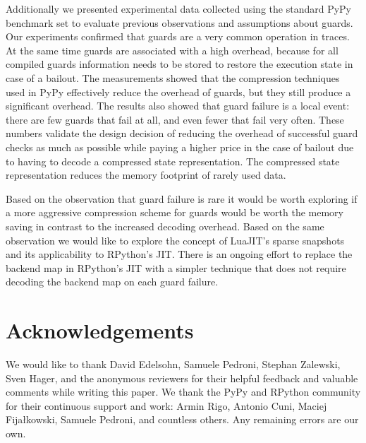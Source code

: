 \documentclass[letter,10pt]{sigplanconf}
\begin{document}
Additionally we presented experimental data collected using the standard PyPy
benchmark set to evaluate previous observations and assumptions about guards. Our
experiments confirmed that guards are a very common
operation in traces. At the same time guards are associated with a high
overhead, because for all compiled guards information needs to be
stored to restore the execution state in case of a bailout. The measurements
showed that the compression techniques used in PyPy effectively reduce the
overhead of guards, but they still produce a significant overhead. The results
also showed that guard failure is a local event: there are few
guards that fail at all, and even fewer that fail very often.
These numbers validate the design decision of reducing the overhead of
successful guard checks as much as possible while paying a higher price in the
case of bailout due to having to decode a compressed state representation.
The compressed state representation reduces the memory footprint of rarely
used data.

Based on the observation that guard failure is rare it
would be worth exploring if a more aggressive compression scheme for guards
would be worth the memory saving in contrast to the increased decoding
overhead. Based on the same observation we would like to explore the concept of
LuaJIT's sparse snapshots and its applicability to RPython's JIT.
There is an ongoing effort to replace the backend map in RPython's JIT with a
simpler technique that does not require decoding the backend map on each guard
failure.

\section*{Acknowledgements}
We would like to thank David Edelsohn, Samuele Pedroni, Stephan Zalewski, Sven
Hager, and the anonymous reviewers for their helpful
feedback and valuable comments while writing this paper.
We thank the PyPy and RPython community for their continuous support and work:
Armin Rigo, Antonio Cuni, Maciej Fijałkowski, Samuele Pedroni, and countless
others. Any remaining errors are our own.




\end{document}
